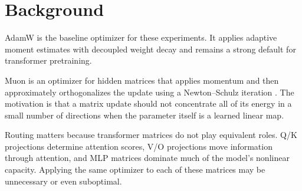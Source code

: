\section{Background}

AdamW is the baseline optimizer for these experiments. It applies adaptive moment estimates with decoupled weight decay and remains a strong default for transformer pretraining.

Muon is an optimizer for hidden matrices that applies momentum and then approximately orthogonalizes the update using a Newton--Schulz iteration \cite{muon_github,muon_writeup}. The motivation is that a matrix update should not concentrate all of its energy in a small number of directions when the parameter itself is a learned linear map.

Routing matters because transformer matrices do not play equivalent roles. Q/K projections determine attention scores, V/O projections move information through attention, and MLP matrices dominate much of the model's nonlinear capacity. Applying the same optimizer to each of these matrices may be unnecessary or even suboptimal.
